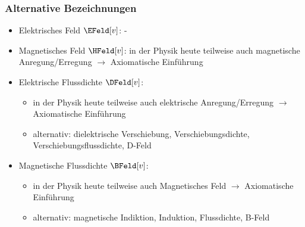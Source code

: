 \begin{frame}
  \frametitle{Alternative Bezeichnungen}
  \begin{itemize}[<+->]
    \item Elektrisches Feld $\EFeld[v]$: - 
    \item Magnetisches Feld $\HFeld[v]$: in der Physik heute
      teilweise auch \alert{magnetische Anregung/Erregung} $\to$ Axiomatische
      Einführung
    \item Elektrische Flussdichte $\DFeld[v]$:
      \begin{itemize}[<+->]
        \item in der Physik heute
      teilweise auch \alert{elektrische Anregung/Erregung} $\to$ Axiomatische
      Einführung
      \item alternativ: \alert{dielektrische Verschiebung,
          Verschiebungsdichte, Verschiebungsflussdichte, D-Feld}
        \end{itemize}
      \item Magnetische Flussdichte $\BFeld[v]$:
        \begin{itemize}[<+->]
          \item in der Physik heute
      teilweise auch \alert{Magnetisches Feld} $\to$ Axiomatische Einführung
      \item alternativ:
        \alert{magnetische Indiktion, Induktion, Flussdichte, B-Feld}
        \end{itemize}
  \end{itemize}    
      
  \end{frame}

